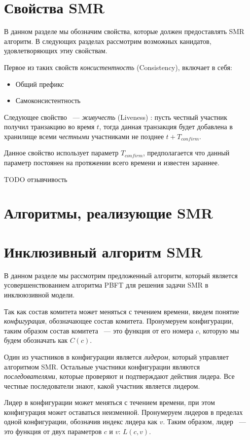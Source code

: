 \section{Свойства SMR}
В данном разделе мы обозначим свойства, которые должен предоставлять SMR алгоритм.
В следующих разделах рассмотрим возможных канидатов, удовлетворяющих этиу свойствам.

Первое из таких свойств \textit{консистентность} (Consistency)\cite{hybrid-consensus}, включает в себя:
\begin{itemize}
\item Общий префикс
\item Самоконсистентность
\end{itemize}

\noindent Следующее свойство ~--- \textit{живучесть} (Liveness) \cite{hybrid-consensus}:
пусть честный участник получил транзакцию во время $t$, тогда данная транзакция будет добавлена в хранилище всеми \textit{честными} участниками не позднее $t + T_{confirm}$.

Данное свойство использует параметр $T_{confirm}$, предполагается что данный параметр постоянен на протяжении всего времени и известен зараннее.

TODO отзывчивость

\section{Алгоритмы, реализующие SMR}

\section{Инклюзивный алгоритм SMR}
В данном разделе мы рассмотрим предложенный алгоритм, 
который является усовершенствованием алгоритма PBFT\cite{pbft} для решения задачи SMR в инклююзивной модели.
 
Так как состав комитета может меняться с течением времени, введем понятие \textit{конфигурация}, обозначающее состав комитета. Пронумеруем конфигурации, таким образом состав комитета ~--- это функция от его номера $c$, которую мы будем обозначать как $C(c)$. 
 
Один из участников в конфигурации является \textit{лидером}, который управляет алгоритмом SMR. 
Остальные участники конфигурации являются \textit{последователями}, которые проверяют и подтверждают действия лидера. Все честные последователи знают, какой участник является лидером.

Лидер в конфигурации может меняться с течением времени, при этом конфигурация может оставаться неизменной. Пронумеруем лидеров в пределах одной конфигурации, обозначив индекс лидера как $v$. Таким образом, лидер ~--- это функция от двух параметров $c$ и $v$: $L(c, v)$.

